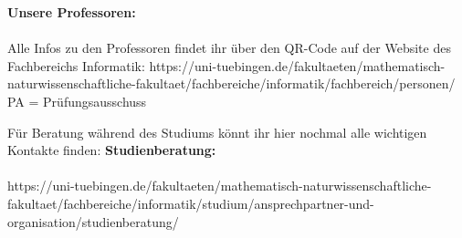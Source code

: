 \renewcommand{\arraystretch}{1}
\scriptsize
\textbf{Unsere Professoren:}\\\\
Alle Infos zu den Professoren findet ihr über den QR-Code auf der Website des Fachbereichs Informatik:
\scriptsize{https://uni-tuebingen.de/fakultaeten/mathematisch-naturwissenschaftliche-fakultaet/fachbereiche/informatik/fachbereich/personen/}
\scriptsize{PA = Prüfungsausschuss}

Für Beratung während des Studiums könnt ihr hier nochmal alle wichtigen Kontakte finden:
\textbf{Studienberatung:}\\\\
\scriptsize{https://uni-tuebingen.de/fakultaeten/mathematisch-naturwissenschaftliche-fakultaet/fachbereiche/informatik/studium/ansprechpartner-und-organisation/studienberatung/}

\vfill
{}
\normalsize
